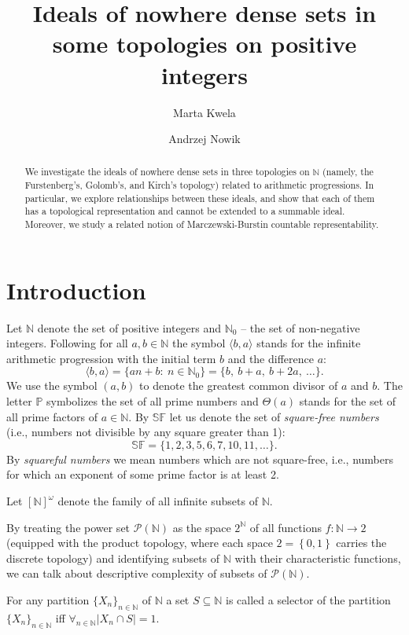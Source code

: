 \documentclass{amsart}
\title[Ideals of nowhere dense sets in some topologies on positive integers]{Ideals of nowhere dense sets in some topologies on positive integers}
\author{Marta Kwela}
\author{Andrzej Nowik}
\theoremstyle{definition}
\newcommand{\N}{{\mathbb N}}
\newcommand{\SqrFr}{\mathbb{SF}}
\newcommand{\InfSubs}{[\N]^{\omega}}
\newcommand{\arithseq}[2]{\langle#2, #1\rangle}
\begin{document}
\begin{abstract}
We investigate the ideals of nowhere dense sets in three topologies on $\N$ (namely, the Furstenberg's, Golomb's, and Kirch's topology) related to arithmetic progressions. In particular, we explore relationships between these ideals, and show that each of them has a topological representation and cannot be extended to a summable ideal. Moreover, we study a related notion of Marczewski-Burstin countable representability.
\end{abstract}
\maketitle


\section{Introduction}

Let $\N$ denote the set of positive integers and $\N_0$ -- the set of non-negative integers. Following \cite{K} for all $a,b\in\N$ the symbol $\arithseq{a}{b}$ stands for the infinite arithmetic progression with the initial term $b$ and the difference $a$:
$$\arithseq{a}{b} = \{an+b :\ n\in\N_0\} = \{b,\ b+a,\ b+2a,\ \ldots\}. $$
We use the symbol $(a,b)$ to denote the greatest common divisor of $a$ and $b$. 
The letter $\mathbb{P}$ symbolizes the set of all prime numbers and $\Theta(a)$ stands for the set of all prime factors of $a\in\N$.
By $\mathbb{SF}$ let us denote the set of \emph{square-free numbers} (i.e., numbers not divisible by any square greater than 1):
$$\SqrFr = \{1,2,3,5,6,7,10,11,\ldots\}.$$
By \emph{squareful numbers} we mean numbers which are not square-free, i.e., numbers for which an exponent of some prime factor is at least 2.

Let $\InfSubs$ denote the family of all infinite subsets of $\N$. 

By treating the power set $\mathcal{P}(\N)$ as the space $2^\N$ of all functions $f\colon\N\to 2$ (equipped with the product topology, where each space $2= \left\{0,1\right\}$ carries the discrete topology) and identifying subsets of $\N$ with their characteristic functions, we can talk about descriptive complexity of subsets of $\mathcal{P}(\N)$.

For any partition $\{X_n\}_{n\in\N}$ of $\N$ a set $S\subseteq\N$
is called a selector of the partition $\{X_n\}_{n\in\N}$ iff
$\forall_{n\in\N} |X_n \cap S| = 1$. 
\end{document}
